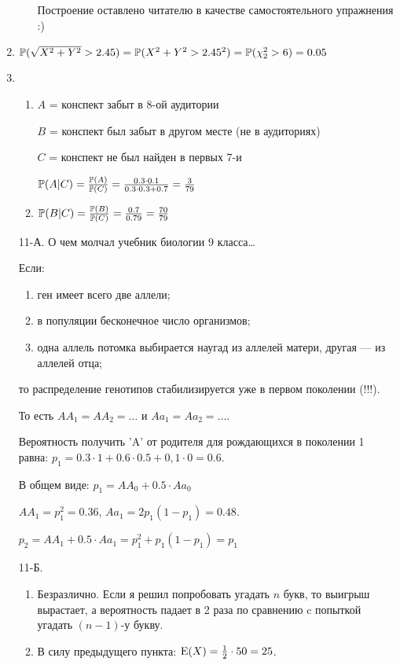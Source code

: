 \begin{enumerate}
\begin{enumerate}
Построение оставлено читателю в качестве самостоятельного
упражнения :)
\end{enumerate}
\item $\P(\sqrt{X^{2}+Y^{2}}>2.45)=\P(X^{2}+Y^{2}>2.45^{2})=\P(\chi_{2}^{2}>6)=0.05$
\item
\begin{enumerate}
\item  $A$ = конспект забыт в 8-ой аудитории

$B$ = конспект был забыт в другом месте (не в аудиториях)

$C$ = конспект не был найден в первых 7-и

$\P(A|C)=\frac{\P(A)}{\P(C)}=\frac{0.3\cdot 0.1}{0.3\cdot 0.3+0.7}=\frac{3}{79}$
\item $\P(B|C)=\frac{\P(B)}{\P(C)}=\frac{0.7}{0.79}=\frac{70}{79}$
\end{enumerate}

\item[11-А.] О чем молчал учебник биологии 9 класса\ldots

Если:
\begin{enumerate}
  \item  ген имеет всего две аллели;
  \item  в популяции бесконечное число организмов;
  \item  одна аллель потомка выбирается наугад из аллелей матери, другая
— из аллелей отца;
\end{enumerate}
то распределение генотипов стабилизируется уже в первом поколении (!!!).

То есть $AA_{1}=AA_{2}=\ldots$ и $Aa_{1}=Aa_{2}=\ldots$.

Вероятность получить 'A' от родителя для рождающихся в поколении 1
равна: $p_{1}=0.3\cdot 1+0.6\cdot 0.5 + 0,1\cdot 0=0.6$.

В общем виде: $p_{1}=AA_{0}+0.5\cdot Aa_{0}$

$AA_{1}=p_{1}^{2}=0.36$, $Aa_{1}=2p_{1}(1-p_{1})=0.48$.

$p_{2}=AA_{1}+0.5\cdot Aa_{1}=p_{1}^{2}+p_{1}(1-p_{1})=p_{1}$
\item[11-Б.]
\begin{enumerate}
\item Безразлично.
Если я решил попробовать угадать $n$ букв, то выигрыш вырастает, а
вероятность падает в 2 раза по сравнению c попыткой угадать $(n-1)$-у букву.
\item В силу предыдущего пункта: $\E(X)=\frac{1}{2}\cdot 50=25$.
\end{enumerate}
\end{enumerate}
